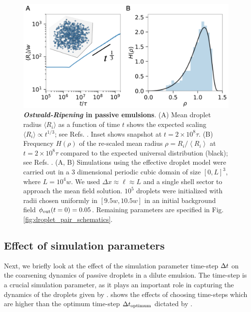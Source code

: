 \begin{figure}[tb]
\centering
\includegraphics[scale=0.5]{MainContent/Figures/passive_emulsions.pdf}
\caption{\textbf{\textit{Ostwald-Ripening} in passive emulsions}.
(A) Mean droplet radius $\langle R_i \rangle$ as a function of time $t$ shows the expected scaling $\langle R_i \rangle \propto t^{1/3}$; see Refs. \cite{Lifshitz,Wagner,LSWanalytics}.
Inset shows snapshot at $t=2 \times 10^8 \tau$.
(B) Frequency $H(\rho)$ of the re-scaled mean radius $\rho = R_i/\left \langle R_i \right \rangle$ at $t = 2 \times 10^8 \tau$ compared to the expected universal distribution (black); see Refs. \cite{Lifshitz,Wagner}.
(A, B)
Simulations using the effective droplet model were carried out in a $3$ dimensional periodic cubic domain of size $[0, L]^3$, where $L = 10^4 w$.
We used $\Delta x \approx \ell \approx L$ and a single shell sector to approach the mean field solution.
$10^5$ droplets were initialized with radii chosen uniformly in $[9.5 w, 10.5 w]$ in an initial background field $\phi_\mathrm{out}(t=0) = 0.05$.
Remaining parameters are specified in Fig. \ref{fig:droplet_pair_schematics}.
}
\label{fig:passive_emulsions}
\end{figure}

\subsection{Effect of simulation parameters}

Next, we briefly look at the effect of the simulation parameter time-step $\Delta t$ on the coarsening dynamics of passive droplets in a dilute emulsion.
The time-step is a crucial simulation parameter, as it plays an important role in capturing the dynamics of the droplets given by .
 shows the effects of choosing time-steps which are higher than the optimum time-step $\Delta t_\mathrm{optimum}$ dictated by .

